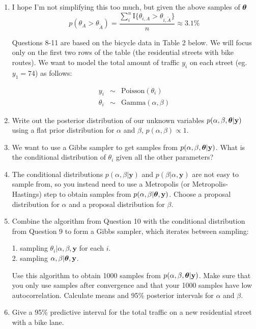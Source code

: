 \documentclass[12pt]{article}
\def\y{\mathbf{y}}
\newcommand{\bth}{\mbox{\boldmath $\theta$}}
\begin{document}
\begin{enumerate}
	
	\item I hope I'm not simplifying this too much, but given the above samples of $\bth$ \[
		p(\theta_A > \theta_{\tilde{A}}) = \dfrac{\sum_{i}^n \mathrm{I} \{\theta_{i,A} > \theta_{i,\tilde{A}}\}}{n} \approx 3.1\%
	\] 
	
	\vspace{.05cm} Questions 8-11 are based on the bicycle data in Table 2 below. We will focus only on the first two rows of the table (the residential streets with bike routes). We want to model the total amount of traffic $y_i$ on each street (eg. $y_1=74$) as follows:
	
	\begin{eqnarray*}
		y_i & \sim & \mbox{Poisson}(\theta_i)\\
		\theta_i & \sim & \mbox{Gamma}(\alpha,\beta) 
	\end{eqnarray*}
	
	\item Write out the posterior distribution of our unknown variables $p(\alpha,\beta,\bth|\y)$ using a flat prior distribution for $\alpha$ and $\beta$, $p(\alpha,\beta) \propto 1$.
	
	\item We want to use a Gibbs sampler to get samples from $p(\alpha,\beta,\bth|\y)$. What is the conditional distribution of $\theta_i$ given all the other parameters?
	
	\item The conditional distributions $p(\alpha,\beta|\y)$ and $p(\beta|\alpha,\y)$ are not easy to sample from, so you instead need to use a Metropolis (or Metropolis-Hastings) step to obtain samples from $p(\alpha,\beta|\bth,\y)$. Choose a proposal distribution for $\alpha$ and a proposal distribution for $\beta$.
	
	\item Combine the algorithm from Question 10 with the conditional distribution from Question 9 to form a Gibbs sampler, which iterates between sampling:
	
	1. sampling $\theta_i | \alpha,\beta,\y$ for each $i$.\\
	2. sampling $\alpha,\beta|\bth,\y$.
	
	Use this algorithm to obtain 1000 samples from $p(\alpha,\beta,\bth|\y)$. Make sure that you only use samples after convergence and that your 1000 samples have low autocorrelation. Calculate means and 95\% posterior intervals for $\alpha$ and $\beta$.
	
	\item Give a 95\% predictive interval for the total traffic on a new residential street with a bike lane. 
\end{enumerate}
\end{document}
